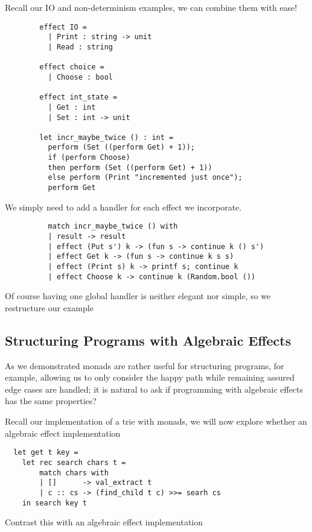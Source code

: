 \begin{example}
    Recall our IO and non-determinism examples,
    we can combine them with ease!
    \begin{verbatim}
        effect IO =
          | Print : string -> unit
          | Read : string

        effect choice =
          | Choose : bool

        effect int_state =
          | Get : int
          | Set : int -> unit

        let incr_maybe_twice () : int =
          perform (Set ((perform Get) + 1));
          if (perform Choose)
          then perform (Set ((perform Get) + 1))
          else perform (Print "incremented just once");
          perform Get
    \end{verbatim}
    We simply need to add a handler for each effect we incorporate.
    \begin{verbatim}
          match incr_maybe_twice () with
          | result -> result
          | effect (Put s') k -> (fun s -> continue k () s')
          | effect Get k -> (fun s -> continue k s s)
          | effect (Print s) k -> printf s; continue k
          | effect Choose k -> continue k (Random.bool ())
    \end{verbatim}
\end{example}

Of course having one global handler is neither elegant nor simple,
so we restructure our example

\subsection{Structuring Programs with Algebraic Effects}
As we demonstrated monads are rather useful for structuring programs,
for example,
allowing us to only consider the happy path while remaining assured
edge cases are handled;
it is natural to ask if programming with algebraic effects
has the same properties?

Recall our implementation of a trie with monads,
we will now explore whether an algebraic effect implementation
\begin{verbatim}
  let get t key =
    let rec search chars t =
        match chars with
        | []      -> val_extract t
        | c :: cs -> (find_child t c) >>= searh cs
    in search key t
\end{verbatim}

Contrast this with an algebraic effect implementation

